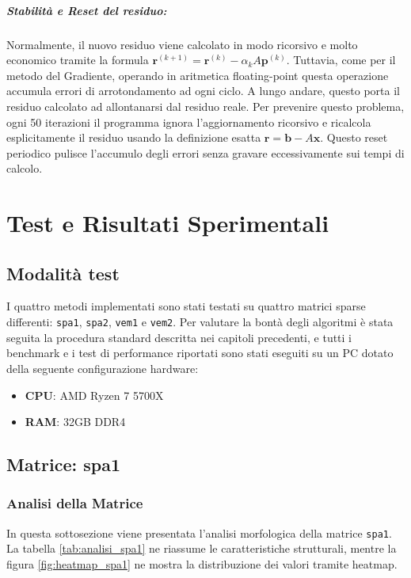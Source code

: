 \documentclass[a4paper, 12pt]{report}
\begin{document}
\paragraph{Stabilità e Reset del residuo:} 
Normalmente, il nuovo residuo viene calcolato in modo ricorsivo e molto economico tramite la formula $\mathbf{r}^{(k+1)} = \mathbf{r}^{(k)} - \alpha_k A\mathbf{p}^{(k)}$. Tuttavia, come per il metodo del Gradiente, operando in aritmetica floating-point questa operazione accumula errori di arrotondamento ad ogni ciclo. A lungo andare, questo porta il residuo calcolato ad allontanarsi dal residuo reale. Per prevenire questo problema, ogni 50 iterazioni il programma ignora l'aggiornamento ricorsivo e ricalcola esplicitamente il residuo usando la definizione esatta $\mathbf{r} = \mathbf{b} - A\mathbf{x}$. Questo reset periodico pulisce l'accumulo degli errori senza gravare eccessivamente sui tempi di calcolo.






\chapter{Test e Risultati Sperimentali}

\section{Modalità test}
I quattro metodi implementati sono stati testati su quattro matrici sparse differenti: \texttt{spa1}, \texttt{spa2}, \texttt{vem1} e \texttt{vem2}. Per valutare la bontà degli algoritmi è stata seguita la procedura standard descritta nei capitoli precedenti, e tutti i benchmark e i test di performance riportati sono stati eseguiti su un PC dotato della seguente configurazione hardware:
\begin{itemize}
    \item \textbf{CPU}: AMD Ryzen 7 5700X
    \item \textbf{RAM}: 32GB DDR4
\end{itemize}


\section{Matrice: spa1}
\subsection{Analisi della Matrice}
In questa sottosezione viene presentata l'analisi morfologica della matrice \texttt{spa1}. La tabella \ref{tab:analisi_spa1} ne riassume le caratteristiche strutturali, mentre la figura \ref{fig:heatmap_spa1} ne mostra la distribuzione dei valori tramite heatmap.
\end{document}

